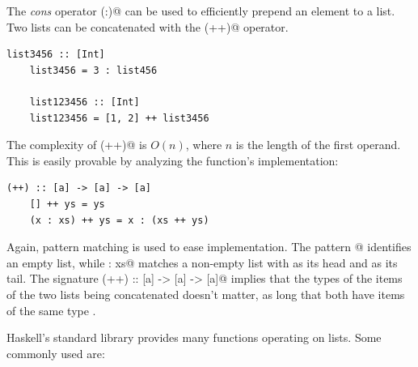 \documentclass[UdineBachThesis,american,11pt]{PhdThesis}
\begin{document}
  The \emph{cons} operator \lstinline@(:)@ can be used to efficiently prepend an
  element to a list. Two lists can be concatenated with the \lstinline@(++)@
  operator.

  \begin{lstlisting}[gobble=4,basicstyle=\ttfamily\small]
    list3456 :: [Int]
    list3456 = 3 : list456

    list123456 :: [Int]
    list123456 = [1, 2] ++ list3456
  \end{lstlisting}

  The complexity of \lstinline@(++)@ is
  $O\mathopen{}\left(n\right)\mathclose{}$, where $n$ is the length of the first
  operand. This is easily provable by analyzing the function's implementation:

  \begin{lstlisting}[gobble=4,basicstyle=\ttfamily\small]
    (++) :: [a] -> [a] -> [a]
    [] ++ ys = ys
    (x : xs) ++ ys = x : (xs ++ ys)
  \end{lstlisting}

  Again, pattern matching is used to ease implementation. The pattern
  \lstinline@[]@ identifies an empty list, while \lstinline@x : xs@ matches a
  non-empty list with \lstinline@x@ as its head and \lstinline@xs@ as its tail.
  The signature \lstinline@(++) :: [a] -> [a] -> [a]@ implies that the types of
  the items of the two lists being concatenated doesn't matter, as long that
  both have items of the same type \lstinline@a@.

  Haskell's standard library provides many functions operating on lists. Some
  commonly used are:
\end{document}
